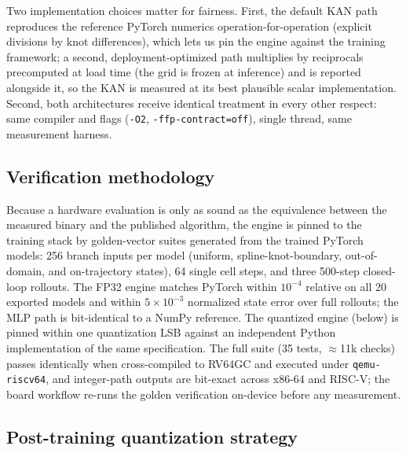 \documentclass[conference]{IEEEtran}
\begin{document}
Two implementation choices matter for fairness. First, the default KAN path
reproduces the reference PyTorch numerics operation-for-operation (explicit
divisions by knot differences), which lets us pin the engine against the
training framework; a second, deployment-optimized path multiplies by
reciprocals precomputed at load time (the grid is frozen at inference) and is
reported alongside it, so the KAN is measured at its best plausible scalar
implementation. Second, both architectures receive identical treatment in
every other respect: same compiler and flags (\texttt{-O2},
\texttt{-ffp-contract=off}), single thread, same measurement harness.

\subsection{Verification methodology}
\label{sec:verification}

Because a hardware evaluation is only as sound as the equivalence between the
measured binary and the published algorithm, the engine is pinned to the
training stack by golden-vector suites generated from the trained PyTorch
models: 256 branch inputs per model (uniform, spline-knot-boundary,
out-of-domain, and on-trajectory states), 64 single cell steps, and three
500-step closed-loop rollouts. The FP32 engine matches PyTorch within
$10^{-4}$ relative on all 20 exported models and within $5\times10^{-3}$
normalized state error over full rollouts; the MLP path is bit-identical to a
NumPy reference. The quantized engine (below) is pinned within one
quantization LSB against an independent Python implementation of the same
specification. The full suite (35 tests, $\approx$11k checks) passes
identically when cross-compiled to RV64GC and executed under
\texttt{qemu-riscv64}, and integer-path outputs are bit-exact across x86-64
and RISC-V; the board workflow re-runs the golden verification on-device
before any measurement.

\subsection{Post-training quantization strategy}
\label{sec:quant}
\end{document}
